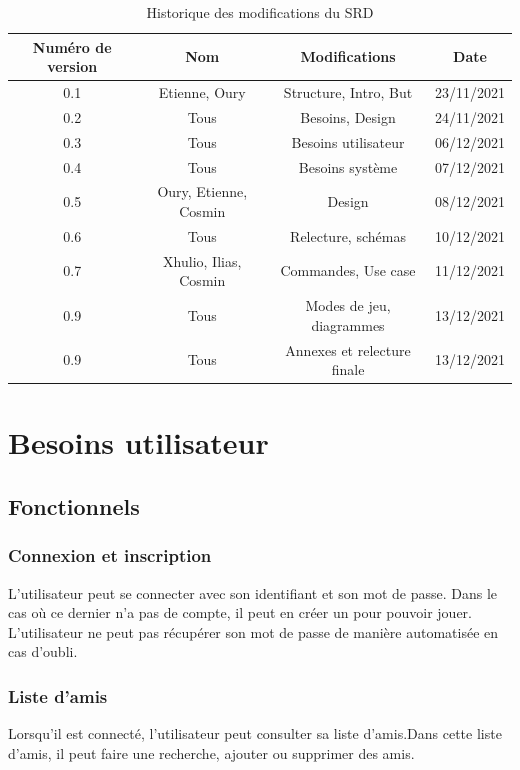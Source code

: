 \documentclass[a4paper,10pt]{article}
\begin{document}
\begin{table}[H]
\begin{tabular}{|c|c|c|c|}
    
    \hline
    Numéro de version & Nom & Modifications & Date\\
    \hline
    0.1 & Etienne, Oury & Structure, Intro, But & 23/11/2021\\
    \hline
    0.2 & Tous & Besoins, Design & 24/11/2021\\
    \hline
    0.3 & Tous & Besoins utilisateur & 06/12/2021\\
    \hline
    0.4 & Tous & Besoins système & 07/12/2021\\
    \hline
    0.5 & Oury, Etienne, Cosmin & Design& 08/12/2021\\
    \hline
    0.6 & Tous & Relecture, schémas& 10/12/2021\\
    \hline
    0.7 & Xhulio, Ilias, Cosmin & Commandes, Use case &11/12/2021\\
    \hline
    0.9 & Tous & Modes de jeu, diagrammes &13/12/2021\\
    \hline
    0.9 & Tous & Annexes et relecture finale &13/12/2021\\
    \hline
    


\end{tabular}
\centering
\caption{Historique des modifications du SRD}
\end{table}
\newpage

\section{Besoins utilisateur}


\subsection{Fonctionnels}

\subsubsection{Connexion et inscription}
L'utilisateur peut se connecter avec son identifiant et son mot de passe.
Dans le cas où ce dernier n'a pas de compte, il peut en créer un pour pouvoir jouer.
L'utilisateur ne peut pas récupérer son mot de passe de manière automatisée en cas d'oubli.
\subsubsection{Liste d'amis}
Lorsqu'il est connecté, l'utilisateur peut consulter sa liste d'amis.Dans cette liste d'amis, il peut faire une recherche, ajouter ou supprimer des amis.
\end{document}
